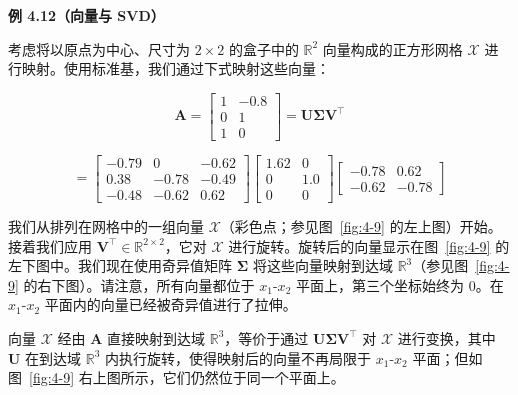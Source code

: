 \begin{notebox}
\textbf{例 4.12（向量与 SVD）}
\end{notebox}

\begin{notebox}
考虑将以原点为中心、尺寸为 $ 2 \times 2 $ 的盒子中的 $ \mathbb{R}^2 $ 向量构成的正方形网格 $ \mathcal{X} $ 进行映射。使用标准基，我们通过下式映射这些向量：

\begin{equation}
\boldsymbol{A} = \begin{bmatrix} 1 & -0.8 \\ 0 & 1 \\ 1 & 0 \end{bmatrix} = \boldsymbol{U} \boldsymbol{\Sigma} \boldsymbol{V}^\top
\tag{4.67a}\label{eq:4-67a}
\end{equation}

\begin{equation}
= \begin{bmatrix} -0.79 & 0 & -0.62 \\ 0.38 & -0.78 & -0.49 \\ -0.48 & -0.62 & 0.62 \end{bmatrix} \begin{bmatrix} 1.62 & 0 \\ 0 & 1.0 \\ 0 & 0 \end{bmatrix} \begin{bmatrix} -0.78 & 0.62 \\ -0.62 & -0.78 \end{bmatrix}
\tag{4.67b}\label{eq:4-67b}
\end{equation}

我们从排列在网格中的一组向量 $ \mathcal{X} $（彩色点；参见图~\ref{fig:4-9} 的左上图）开始。接着我们应用 $ \boldsymbol{V}^\top \in \mathbb{R}^{2 \times 2} $，它对 $ \mathcal{X} $ 进行旋转。旋转后的向量显示在图~\ref{fig:4-9} 的左下图中。我们现在使用奇异值矩阵 $ \boldsymbol{\Sigma} $ 将这些向量映射到达域 $ \mathbb{R}^3 $（参见图~\ref{fig:4-9} 的右下图）。请注意，所有向量都位于 $ x_1\text{-}x_2 $ 平面上，第三个坐标始终为 0。在 $ x_1\text{-}x_2 $ 平面内的向量已经被奇异值进行了拉伸。
\end{notebox}

\begin{notebox}
向量 $ \mathcal{X} $ 经由 $ \boldsymbol{A} $ 直接映射到达域 $ \mathbb{R}^3 $，等价于通过 $ \boldsymbol{U} \boldsymbol{\Sigma} \boldsymbol{V}^\top $ 对 $ \mathcal{X} $ 进行变换，其中 $ \boldsymbol{U} $ 在到达域 $ \mathbb{R}^3 $ 内执行旋转，使得映射后的向量不再局限于 $ x_1\text{-}x_2 $ 平面；但如图~\ref{fig:4-9} 右上图所示，它们仍然位于同一个平面上。
\end{notebox}



